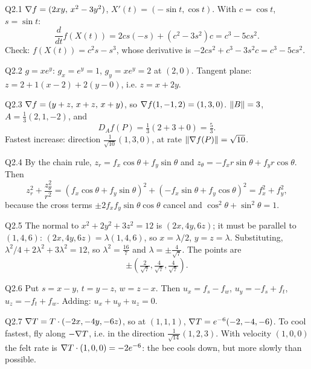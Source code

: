 \begin{solution}{Q2.1}
$\nabla f=(2xy,\,x^2-3y^2)$, $X'(t)=(-\sin t,\cos t)$. With $c=\cos t$, $s=\sin t$:
\[ \frac{d}{dt}f(X(t))=2cs(-s)+(c^2-3s^2)c=c^3-5cs^2 . \]
Check: $f(X(t))=c^2s-s^3$, whose derivative is $-2cs^2+c^3-3s^2c=c^3-5cs^2$.
\end{solution}

\begin{solution}{Q2.2}
$g=xe^y$: $g_x=e^y=1$, $g_y=xe^y=2$ at $(2,0)$. Tangent plane: $z=2+1(x-2)+2(y-0)$, i.e. $z=x+2y$.
\end{solution}

\begin{solution}{Q2.3}
$\nabla f=(y+z,\,x+z,\,x+y)$, so $\nabla f(1,-1,2)=(1,3,0)$. $\left\lVert B\right\rVert=3$, $A=\tfrac13(2,1,-2)$, and
\[ D_Af(P)=\tfrac13(2+3+0)=\tfrac53 . \]
Fastest increase: direction $\frac{1}{\sqrt{10}}(1,3,0)$, at rate $\left\lVert \nabla f(P)\right\rVert=\sqrt{10}$.
\end{solution}

\begin{solution}{Q2.4}
By the chain rule, $z_r=f_x\cos\theta+f_y\sin\theta$ and $z_\theta=-f_xr\sin\theta+f_yr\cos\theta$. Then
\[
z_r^2+\frac{z_\theta^2}{r^2}=(f_x\cos\theta+f_y\sin\theta)^2+(-f_x\sin\theta+f_y\cos\theta)^2=f_x^2+f_y^2,
\]
because the cross terms $\pm2f_xf_y\sin\theta\cos\theta$ cancel and $\cos^2\theta+\sin^2\theta=1$.
\end{solution}

\begin{solution}{Q2.5}
The normal to $x^2+2y^2+3z^2=12$ is $(2x,4y,6z)$; it must be parallel to $(1,4,6)$:
$(2x,4y,6z)=\lambda(1,4,6)$, so $x=\lambda/2$, $y=z=\lambda$. Substituting,
$\lambda^2/4+2\lambda^2+3\lambda^2=12$, so $\lambda^2=\frac{16}{7}$ and $\lambda=\pm\frac{4}{\sqrt7}$. The points are
\[ \pm\left(\tfrac{2}{\sqrt7},\tfrac{4}{\sqrt7},\tfrac{4}{\sqrt7}\right). \]
\end{solution}

\begin{solution}{Q2.6}
Put $s=x-y$, $t=y-z$, $w=z-x$. Then
$u_x=f_s-f_w$, $u_y=-f_s+f_t$, $u_z=-f_t+f_w$. Adding: $u_x+u_y+u_z=0$.
\end{solution}

\begin{solution}{Q2.7}
$\nabla T=T\cdot(-2x,-4y,-6z)$, so at $(1,1,1)$, $\nabla T=e^{-6}(-2,-4,-6)$. To cool fastest, fly
along $-\nabla T$, i.e. in the direction $\frac{1}{\sqrt{14}}(1,2,3)$. With velocity $(1,0,0)$ the felt
rate is $\nabla T\cdot(1,0,0)=-2e^{-6}$: the bee cools down, but more slowly than possible.
\end{solution}

